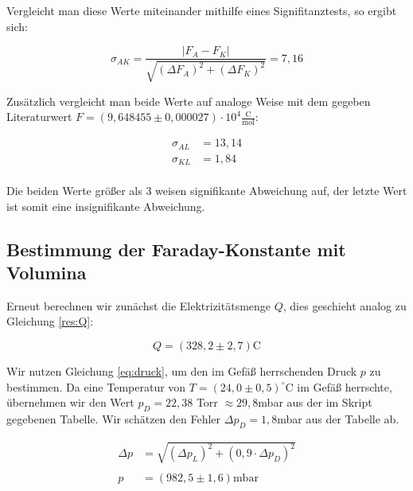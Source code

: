 \documentclass{article}
\begin{document}
Vergleicht man diese Werte miteinander mithilfe eines Signifitanztests, so ergibt sich:

\begin{equation}
    \sigma_{AK} = \frac{|F_A - F_K|}{\sqrt{(\Delta F_A)^2 + (\Delta F_K)^2}} = 7,16
\end{equation}

Zusätzlich vergleicht man beide Werte auf analoge Weise mit dem gegeben Literaturwert $F = (9,648455 \pm 0,000027) \cdot 10^4 \frac{\text{C}}{\text{mol}}$:

\begin{equation}
    \begin{split}
        \sigma_{AL} &= 13,14 \\
        \sigma_{KL} &= 1,84 \\
    \end{split}
\end{equation}

Die beiden Werte größer als 3 weisen signifikante Abweichung auf, der letzte Wert ist somit eine insignifikante Abweichung.

\newpage

\subsection{Bestimmung der Faraday-Konstante mit Volumina}

Erneut berechnen wir zunächst die Elektrizitätsmenge $Q$, dies geschieht analog zu Gleichung \ref{res:Q}:

\begin{equation}
    Q = (328,2 \pm 2,7) \text{C}
\end{equation}

Wir nutzen Gleichung \ref{eq:druck}, um den im Gefäß herrschenden Druck $p$ zu bestimmen. Da eine Temperatur von $T = (24,0 \pm 0,5)^\circ$C im Gefäß herrschte, übernehmen wir den Wert $p_D = 22,38$ Torr $\approx 29,8$mbar aus der im Skript gegebenen Tabelle. Wir schätzen den Fehler $\Delta p_D = 1,8$mbar aus der Tabelle ab.

\begin{equation}
    \begin{split}
        \Delta p &= \sqrt{(\Delta p_L)^2 + (0,9 \cdot \Delta p_D)^2} \\ \\
        p &= (982,5 \pm 1,6) \text{mbar}
    \end{split}
\end{equation}
\end{document}
